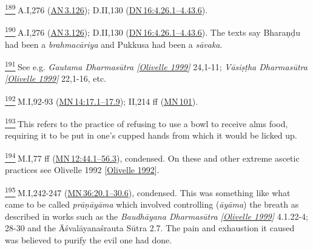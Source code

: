 \label{footprints_split_024.html_fn189}
\hyperref[footprints_split_009.htmlux5cux23fnref189]{\textsuperscript{189}} A.I,276
(\href{https://suttacentral.net/an3.126/en/sujato}{AN\,3.126}); D.II,130
(\href{https://suttacentral.net/dn16/en/sujato\#4.26.1}{DN\,16:4.26.1--4.43.6}).

\label{footprints_split_024.html_fn190}
\hyperref[footprints_split_009.htmlux5cux23fnref190]{\textsuperscript{190}} A.I,276
(\href{https://suttacentral.net/an3.126/en/sujato}{AN\,3.126}); D.II,130
(\href{https://suttacentral.net/dn16/en/sujato\#4.26.1}{DN\,16:4.26.1--4.43.6}).
The texts say Bharaṇḍu had been a \emph{brahmacāriya} and Pukkusa had
been a \emph{sāvaka}.

\label{footprints_split_024.html_fn191}
\hyperref[footprints_split_009.htmlux5cux23fnref191]{\textsuperscript{191}} See
e.g. \emph{{Gautama Dharmasūtra
{{[}\hyperref[footprints_split_022.htmlux5cux23Olivelleux5cux25201999]{Olivelle
1999}{]}}}} 24,1-11; \emph{{Vāsiṣṭha Dharmasūtra
{{[}\hyperref[footprints_split_022.htmlux5cux23Olivelleux5cux25201999]{Olivelle
1999}{]}}}} 22,1-16, etc.

\label{footprints_split_024.html_fn192}
\hyperref[footprints_split_009.htmlux5cux23fnref192]{\textsuperscript{192}} M.I,92-93
(\href{https://suttacentral.net/mn14/en/sujato\#17.1}{MN\,14:17.1--17.9});
II,214 ff (\href{https://suttacentral.net/mn101/en/sujato}{MN\,101}).

\label{footprints_split_024.html_fn193}
\hyperref[footprints_split_009.htmlux5cux23fnref193]{\textsuperscript{193}} This
refers to the practice of refusing to use a bowl to receive alms food,
requiring it to be put in one's cupped hands from which it would be
licked up.

\label{footprints_split_024.html_fn194}
\hyperref[footprints_split_009.htmlux5cux23fnref194]{\textsuperscript{194}} M.I,77
ff
(\href{https://suttacentral.net/mn12/en/sujato\#44.1}{MN\,12:44.1--56.3}),
condensed. On these and other extreme ascetic practices see {Olivelle
1992
{{[}\hyperref[footprints_split_022.htmlux5cux23Olivelleux5cux25201992]{Olivelle
1992}{]}}}.

\label{footprints_split_024.html_fn195}
\hyperref[footprints_split_009.htmlux5cux23fnref195]{\textsuperscript{195}} M.I,242-247
(\href{https://suttacentral.net/mn36/en/sujato\#20.1}{MN\,36:20.1--30.6}),
condensed. This was something like what came to be called
\emph{prāṇāyāma} which involved controlling (\emph{āyāma}) the breath as
described in works such as the \emph{{Baudhāyana Dharmasūtra
{{[}\hyperref[footprints_split_022.htmlux5cux23Olivelleux5cux25201999]{Olivelle
1999}{]}}}} 4.1.22-4; 28-30 and the Āśvalāyanaśrauta Sūtra 2.7. The pain
and exhaustion it caused was believed to purify the evil one had done.

